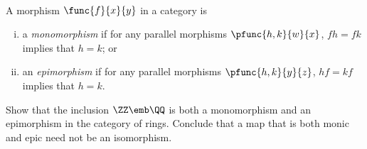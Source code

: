 \documentclass[main.tex]{subfiles}
\begin{document}
\paragraph{}
\begin{definition}
	A morphism \(\func{f}{x}{y}\) in a category is
	\begin{enumerate}[(i)]
		\item a \emph{monomorphism} if for any parallel morphisms
			\(\pfunc{h,k}{w}{x}\), \(fh=fk\) implies that \(h=k\); or
		\item an \emph{epimorphism} if for any parallel morphisms
			\(\pfunc{h,k}{y}{z}\), \(hf=kf\) implies that \(h=k\).
	\end{enumerate}
\end{definition}
\popthm

\begin{exercise}
	Show that the inclusion \(\ZZ\emb\QQ\) is both a monomorphism and an
	epimorphism in the category \Ring of rings. Conclude that a map that is both
	monic and epic need not be an isomorphism.
\end{exercise}
\end{document}
